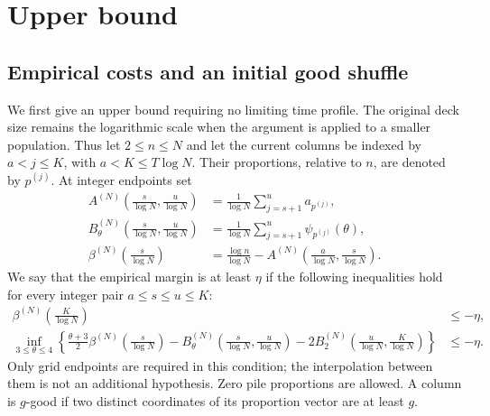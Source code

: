 \documentclass[11pt]{article}
\numberwithin{equation}{section}
\theoremstyle{definition}
\theoremstyle{remark}
\newcommand{\1}{\mathbf 1}
\begin{document}
\section{Upper bound}\label{sec:upper-bound}\label{sec:upper}
\subsection{Empirical costs and an initial good shuffle}
We first give an upper bound requiring no limiting time profile.
The original deck size remains the logarithmic scale when the argument
is applied to a smaller population. Thus let $2\le n\le N$ and let
the current columns be indexed by $a<j\le K$, with $a<K\le T\log N$.
Their proportions, relative to $n$, are denoted by $p^{(j)}$. At integer
endpoints set
\begin{align*}
 A^{(N)}\left(\frac{s}{\log N},\frac{u}{\log N}\right)
       &=\frac1{\log N}\sum_{j=s+1}^u a_{p^{(j)}},\\
 B^{(N)}_\theta\left(\frac{s}{\log N},\frac{u}{\log N}\right)
       &=\frac1{\log N}\sum_{j=s+1}^u\psi_{p^{(j)}}(\theta),\\
 \beta^{(N)}\left(\frac{s}{\log N}\right)
 &=\frac{\log n}{\log N}
       -A^{(N)}\left(\frac{a}{\log N},\frac{s}{\log N}\right).
\end{align*}
We say that the empirical margin is at least $\eta$ if the following
inequalities hold for every integer pair $a\le s\le u\le K$:
\begin{equation}%
\label{eq:upper-empirical-margin}
 \begin{split}
 \beta^{(N)}\left(\frac K{\log N}\right)&\le-\eta,\\
 \inf_{3\le\theta\le4}\left\{
       \frac{\theta+3}{2}\beta^{(N)}\left(\frac s{\log N}\right)
       -B^{(N)}_\theta\left(\frac s{\log N},\frac u{\log N}\right)
       -2B^{(N)}_2\left(\frac u{\log N},\frac K{\log N}\right)\right\}
       &\le-\eta.
 \end{split}
\end{equation}
Only grid endpoints are required in this condition; the interpolation
between them is not an additional hypothesis. Zero pile proportions
are allowed. A column is $g$-good if two distinct coordinates of its
proportion vector are at least $g$.
\end{document}
